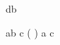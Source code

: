 \begin{eqcode}{d}{b}{}{}
   \lend
\end{eqcode}

\begin{eqcode}{a}{b}{}{}
  c \in ( \to {}) \lend
  a \gets c \lend %
\end{eqcode}
